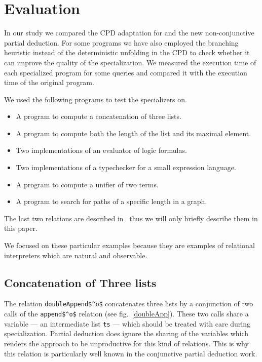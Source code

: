 \section{Evaluation}
In our study we compared the CPD adaptation for \mk{} and the new non-conjunctive partial deduction.
For some programs we have also employed the branching heuristic instead of the deterministic unfolding in the CPD to check whether it can improve the quality of the specialization.
We measured the execution time of each specialized program for some queries and compared it with the execution time of the original program.

We used the following programs to test the specializers on.
\begin{itemize}
  \item A program to compute a concatenation of three lists.
  \item A program to compute both the length of the list and its maximal element.
  \item Two implementations of an evaluator of logic formulas.
  \item Two implementations of a typechecker for a small expression language.
  \item A program to compute a unifier of two terms.
  \item A program to search for paths of a specific length in a graph.
\end{itemize}

The last two relations are described in~\cite{lozov2019relational} thus we will only briefly describe them in this paper.

We focused on these particular examples because they are examples of relational interpreters which are natural and observable.

\subsection{Concatenation of Three lists}

The relation \lstinline{doubleAppend$^o$} concatenates three lists by a conjunction of two calls of the \lstinline{append$^o$} relation (see fig.~\ref{doubleApp}).
These two calls share a variable --- an intermediate list \lstinline{ts} --- which should be treated with care during specialization.
Partial deduction does ignore the sharing of the variables which renders the approach to be unproductive for this kind of relations.
This is why this relation is particularly well known in the conjunctive partial deduction work.

